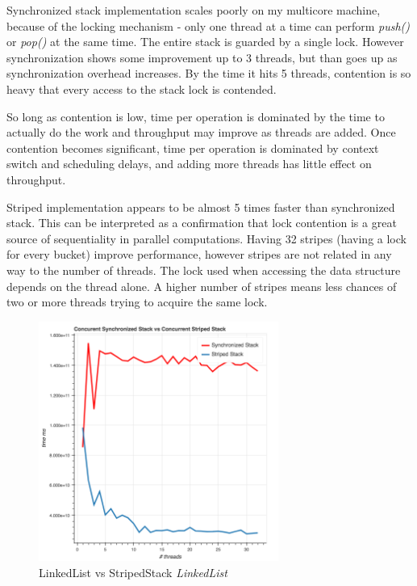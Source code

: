 \documentclass[format=acmsmall, review=false, screen=true]{acmart}
\begin{document}
Synchronized stack implementation scales poorly on my multicore machine, because
of the locking mechanism - only one thread at a time can perform \textit{push()} or \textit{pop()} at the same time. The entire stack is guarded by a single lock. However synchronization shows some improvement up to 3 threads, but than goes up as synchronization overhead increases. By the time it hits 5 threads, contention is so heavy that every access to the stack lock is contended.

So long as contention  is low, time  per operation is dominated by the time to actually do the work and throughput may improve as threads are added. Once contention becomes significant, time per  operation is dominated by context switch and scheduling delays, and adding more threads has  little  effect on throughput.

Striped implementation appears to be almost 5 times faster than synchronized stack.
This can be interpreted as a confirmation that lock contention is a great source of
sequentiality in parallel computations. Having 32 stripes (having a lock for every bucket) improve performance, however stripes are not related in any way to the number of threads. The lock used when accessing the data structure depends on the thread alone. A higher number of stripes means less chances of two or more threads trying to acquire the same lock.

\begin{figure}
  \includegraphics[width=0.7\textwidth]{linkedlist.png}
  \caption{LinkedList vs StripedStack \textit{LinkedList}}
  \label{fig:linkedlist}
\end{figure}
\end{document}
